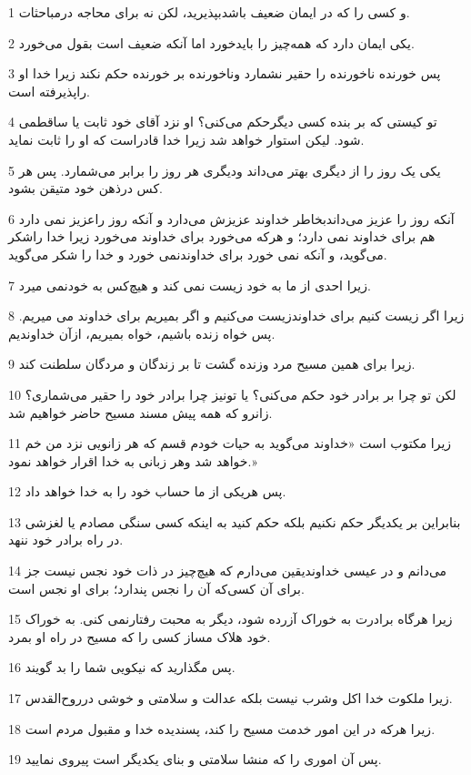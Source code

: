 \par 1 و کسی را که در ایمان ضعیف باشدبپذیرید، لکن نه برای محاجه درمباحثات.
\par 2 یکی ایمان دارد که همه‌چیز را بایدخورد اما آنکه ضعیف است بقول می‌خورد.
\par 3 پس خورنده ناخورنده را حقیر نشمارد وناخورنده بر خورنده حکم نکند زیرا خدا او راپذیرفته است.
\par 4 تو کیستی که بر بنده کسی دیگرحکم می‌کنی؟ او نزد آقای خود ثابت یا ساقطمی شود. لیکن استوار خواهد شد زیرا خدا قادراست که او را ثابت نماید.
\par 5 یکی یک روز را از دیگری بهتر می‌داند ودیگری هر روز را برابر می‌شمارد. پس هر کس درذهن خود متیقن بشود.
\par 6 آنکه روز را عزیز می‌داندبخاطر خداوند عزیزش می‌دارد و آنکه روز راعزیز نمی دارد هم برای خداوند نمی دارد؛ و هرکه می‌خورد برای خداوند می‌خورد زیرا خدا راشکر می‌گوید، و آنکه نمی خورد برای خداوندنمی خورد و خدا را شکر می‌گوید.
\par 7 زیرا احدی از ما به خود زیست نمی کند و هیچ‌کس به خودنمی میرد.
\par 8 زیرا اگر زیست کنیم برای خداوندزیست می‌کنیم و اگر بمیریم برای خداوند می میریم. پس خواه زنده باشیم، خواه بمیریم، ازآن خداوندیم.
\par 9 زیرا برای همین مسیح مرد وزنده گشت تا بر زندگان و مردگان سلطنت کند.
\par 10 لکن تو چرا بر برادر خود حکم می‌کنی؟ یا تونیز چرا برادر خود را حقیر می‌شماری؟ زانرو که همه پیش مسند مسیح حاضر خواهیم شد.
\par 11 زیرا مکتوب است «خداوند می‌گوید به حیات خودم قسم که هر زانویی نزد من خم خواهد شد وهر زبانی به خدا اقرار خواهد نمود.»
\par 12 پس هریکی از ما حساب خود را به خدا خواهد داد.
\par 13 بنابراین بر یکدیگر حکم نکنیم بلکه حکم کنید به اینکه کسی سنگی مصادم یا لغزشی در راه برادر خود ننهد.
\par 14 می‌دانم و در عیسی خداوندیقین می‌دارم که هیچ‌چیز در ذات خود نجس نیست جز برای آن کسی‌که آن را نجس پندارد؛ برای او نجس است.
\par 15 زیرا هرگاه برادرت به خوراک آزرده شود، دیگر به محبت رفتارنمی کنی. به خوراک خود هلاک مساز کسی را که مسیح در راه او بمرد.
\par 16 پس مگذارید که نیکویی شما را بد گویند.
\par 17 زیرا ملکوت خدا اکل وشرب نیست بلکه عدالت و سلامتی و خوشی درروح‌القدس.
\par 18 زیرا هر‌که در این امور خدمت مسیح را کند، پسندیده خدا و مقبول مردم است.
\par 19 پس آن اموری را که منشا سلامتی و بنای یکدیگر است پیروی نمایید.
